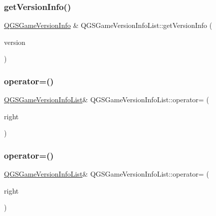 \subsubsection{\texorpdfstring{get\+Version\+Info()}{getVersionInfo()}}
{\footnotesize\ttfamily \mbox{\hyperlink{class_q_g_s_game_version_info}{Q\+G\+S\+Game\+Version\+Info}} \& Q\+G\+S\+Game\+Version\+Info\+List\+::get\+Version\+Info (\begin{DoxyParamCaption}\item[{const Q\+String \&}]{version }\end{DoxyParamCaption})}

\mbox{\label{class_q_g_s_game_version_info_list_a42160ed04b523d4b87d8875e25219358}} 
\subsubsection{\texorpdfstring{operator=()}{operator=()}\hspace{0.1cm}{\footnotesize\ttfamily [1/2]}}
{\footnotesize\ttfamily \mbox{\hyperlink{class_q_g_s_game_version_info_list}{Q\+G\+S\+Game\+Version\+Info\+List}}\& Q\+G\+S\+Game\+Version\+Info\+List\+::operator= (\begin{DoxyParamCaption}\item[{const \mbox{\hyperlink{class_q_g_s_game_version_info_list}{Q\+G\+S\+Game\+Version\+Info\+List}} \&}]{right }\end{DoxyParamCaption})\hspace{0.3cm}{\ttfamily [default]}}

\mbox{\label{class_q_g_s_game_version_info_list_ad227a188528f1c32d6209a6793471388}} 
\subsubsection{\texorpdfstring{operator=()}{operator=()}\hspace{0.1cm}{\footnotesize\ttfamily [2/2]}}
{\footnotesize\ttfamily \mbox{\hyperlink{class_q_g_s_game_version_info_list}{Q\+G\+S\+Game\+Version\+Info\+List}}\& Q\+G\+S\+Game\+Version\+Info\+List\+::operator= (\begin{DoxyParamCaption}\item[{\mbox{\hyperlink{class_q_g_s_game_version_info_list}{Q\+G\+S\+Game\+Version\+Info\+List}} \&\&}]{right }\end{DoxyParamCaption})\hspace{0.3cm}{\ttfamily [default]}}

